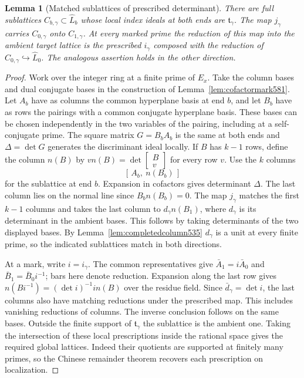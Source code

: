 \documentclass[a4paper,11pt]{article}
\newtheorem{lemma}[proposition]{Lemma}
\theoremstyle{definition}
\theoremstyle{remark}
\numberwithin{equation}{section}
\begin{document}
\begin{lemma}[Matched sublattices of prescribed determinant]
\leavevmode\label{lem:hyperplanelattice603}
There are full sublattices \(C_{b,\gamma}\subset\widehat L_b\)
whose local index ideals at both ends are \(\mathfrak t_\gamma\).
The map \(j_\gamma\) carries \(C_{0,\gamma}\) onto \(C_{1,\gamma}\).
At every marked prime the reduction of this map into the
ambient target lattice is the prescribed \(i_\gamma\) composed
with the reduction of \(C_{0,\gamma}\hookrightarrow\widehat L_0\).
The analogous assertion holds in the other direction.
\end{lemma}
\begin{proof}
Work over the integer ring at a finite prime of \(E_x\). Take
the column bases and dual conjugate bases in the construction
of Lemma~\ref{lem:cofactormark581}. Let \(A_b\) have as columns
the common hyperplane basis at end \(b\), and let \(B_b\) have
as rows the pairings with a common conjugate hyperplane basis.
These bases can be chosen independently in the two variables
of the pairing, including at a self-conjugate prime.
The square matrix \(G=B_bA_b\) is the same at both ends and
\(\Delta=\det G\) generates the discriminant ideal locally.
If \(B\) has \(k-1\) rows, define the column \(n(B)\) by
\(v n(B)=\det\left[\begin{smallmatrix}B\\v\end{smallmatrix}\right]\)
for every row \(v\). Use the \(k\) columns
\[
                         [\,A_b,\ n(B_b)\,]
\]
for the sublattice at end \(b\). Expansion in cofactors gives
determinant \(\Delta\). The last column lies on the normal
line since \(B_b n(B_b)=0\). The map \(j_\gamma\) matches
the first \(k-1\) columns and takes the last column to
\(d_\gamma n(B_1)\), where \(d_\gamma\) is its determinant
in the ambient bases. This follows by taking determinants of
the two displayed bases. By Lemma~\ref{lem:completedcolumn535}
\(d_\gamma\) is a unit at every finite prime, so the indicated
sublattices match in both directions.

At a mark, write \(i=i_\gamma\). The common representatives
give \(\bar A_1=i\bar A_0\) and \(\bar B_1=\bar B_0 i^{-1}\);
bars here denote reduction. Expansion along the last row gives
\(n(B i^{-1})=(\det i)^{-1}i n(B)\) over the residue field.
Since \(\bar d_\gamma=\det i\), the last columns also have
matching reductions under the prescribed map. This includes
vanishing reductions of columns. The inverse conclusion follows
on the same bases. Outside the finite support of
\(\mathfrak t_\gamma\) the sublattice is the ambient one.
Taking the intersection of these local prescriptions inside
the rational space gives the required global lattices. Indeed
their quotients are supported at finitely many primes, so
the Chinese remainder theorem recovers each prescription on
localization.
\end{proof}
\end{document}
